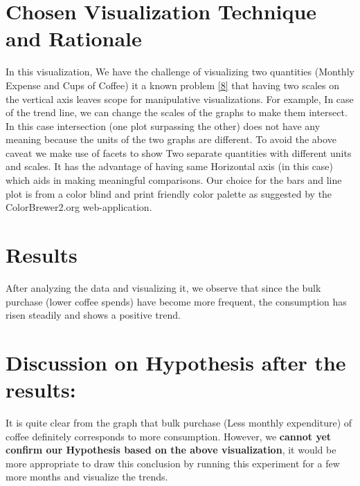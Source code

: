 \documentclass[a4paper,11pt]{article}
\begin{document}
\begin{multicols}{2}
\section*{Chosen Visualization Technique and Rationale}
In this visualization, We have the challenge of visualizing two quantities (Monthly Expense and Cups of Coffee) it a known problem \ref{8} that having two scales on the vertical axis leaves scope for manipulative visualizations. For example, In case of the trend line, we can change the scales of the graphs to make them intersect. In this case intersection (one plot surpassing the other) does not have any meaning because the units of the two graphs are different.
To avoid the above caveat we make use of facets to show Two separate quantities with different units and scales. It has the advantage of having same Horizontal axis (in this case) which aids in making meaningful comparisons.
Our choice for the bars and line plot is from a color blind and print friendly color palette  as suggested by the ColorBrewer2.org web-application.
\section*{Results}
After analyzing the data and visualizing it, we observe that since the bulk purchase (lower coffee spends) have become more frequent, the consumption has risen steadily and shows a positive trend.
\section*{Discussion on Hypothesis after the results: }
It is quite clear from the graph that bulk purchase (Less monthly expenditure) of coffee definitely corresponds to more consumption. However, we \textbf{cannot yet confirm our Hypothesis based on the above visualization}, it would be more appropriate to draw this conclusion by running this experiment for a few more months and visualize the trends.\\
\vfill

\end{multicols}
\end{document}
